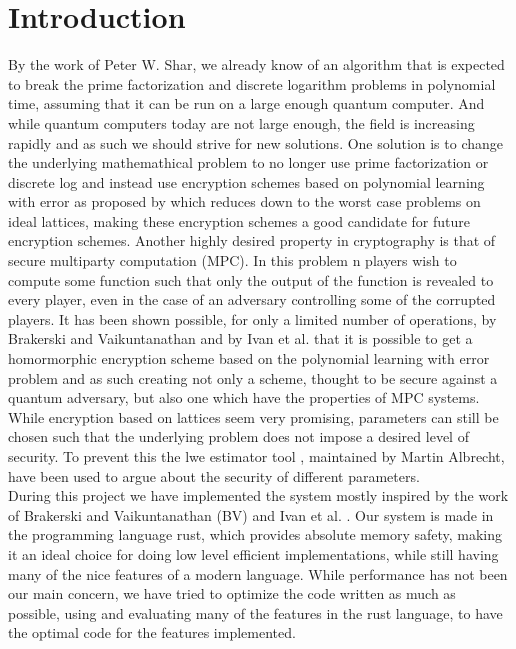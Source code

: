 \documentclass[../main.tex]{subfiles}
\begin{document}
\section{Introduction}
	By the work of Peter W. Shar, we already know of an algorithm that is expected to break
	the prime factorization and discrete logarithm problems in polynomial time, assuming that it can be run
	on a large enough quantum computer. %
	And while quantum computers today are not large enough, the field is increasing rapidly and as such
	we should strive for new solutions.
	One solution is to change the underlying mathemathical problem to no longer use prime factorization or
	discrete log and instead use encryption schemes based on polynomial learning with error as proposed by %
	which reduces down to the worst case problems on ideal lattices, making these encryption schemes a good
	candidate for future encryption schemes.
	Another highly desired property in cryptography is that of secure multiparty computation (MPC).
	In this problem n players wish to compute some function such that only the output of the function
	is revealed to every player, even in the case of an adversary controlling some of the corrupted players.
	It has been shown possible, for only a limited number of operations, by Brakerski and Vaikuntanathan
	and by Ivan et al. \cite{damgaard2012multiparty} that it is possible to get
	a homormorphic encryption scheme based on the polynomial learning with error problem and as such
	creating not only a scheme, thought to be secure against a quantum adversary, but also one which
	have the properties of MPC systems. %
	While encryption based on lattices seem very promising, parameters can still be chosen such that the
	underlying problem does not impose a desired level of security.
	To prevent this the lwe estimator tool 
	, maintained by Martin Albrecht, have been used to argue about the security of different parameters.
	\\[5mm]
	During this project we have implemented the system mostly inspired by the work of Brakerski and Vaikuntanathan (BV)
	and Ivan et al. \cite{damgaard2012multiparty}.
	Our system is made in the programming language rust, which provides absolute memory safety,
	making it an ideal choice for doing low level efficient implementations, while still having many of
	the nice features of a modern language.
	While performance has not been our main concern, we have tried to optimize the code written as much as possible,
	using and evaluating many of the features in the rust language, to have the optimal code for the features
	implemented.
\end{document}
